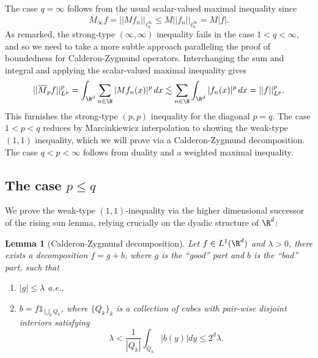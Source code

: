 \documentclass[reqno]{amsart}
\newtheorem{lemma}[theorem]{Lemma}
\theoremstyle{definition}
\theoremstyle{remark}
\begin{document}
The case $q = \infty$ follows from the usual scalar-valued maximal inequality since
	\[ \overline M_\infty f = ||M f_n||_{\ell^\infty_n} \leq M ||f_n||_{\ell^\infty_n} = M|f|.  \]
As remarked, the strong-type $(\infty, \infty)$ inequality fails in the case $1 < q < \infty$, and so we need to take a more subtle approach paralleling the proof of boundedness for Calderon-Zygmund operators. Interchanging the sum and integral and applying the scalar-valued maximal inequality gives
	\[ ||\overline M_p f||_{L^p}^p  = \int_{\R^d} \sum_{n \in \N} |Mf_n (x)|^p \, dx \lesssim \sum_{n \in \N} \int_{\R^d} |f_n(x)|^p \, dx = ||f||_{L^p}^p.\]
This furnishes the strong-type $(p, p)$ inequality for the diagonal $p = q$. The case $1 < p < q$ reduces by Marcinkiewicz interpolation to showing the weak-type $(1, 1)$ inequality, which we will prove via a Calderon-Zygmund decomposition. The case $q < p < \infty$ follows from duality and a weighted maximal inequality. 

\subsection{The case $p \leq q$}

We prove the weak-type $(1, 1)$-inequality via the higher dimensional successor of the rising sun lemma, relying crucially on the dyadic structure of $\R^d$:

\begin{lemma}[Calderon-Zygmund decomposition]
	Let $f \in L^1 (\R^d)$ and $\lambda > 0$, there exists a decomposition $f = g + b$, where $g$ is the ``good'' part and $b$ is the ``bad'' part, such that 
	\begin{enumerate}
		\item $|g| \leq \lambda$ a.e.,
		\item $b = f \mathbb 1_{\bigcup_k Q_k}$, where $\{Q_k\}_k$ is a collection of cubes with pair-wise disjoint interiors satisfying
						\[ \lambda < \frac{1}{|Q_k|} \int_{Q_k} |b(y)| dy \leq 2^d \lambda. \]
	\end{enumerate}
\end{lemma}
\end{document}
